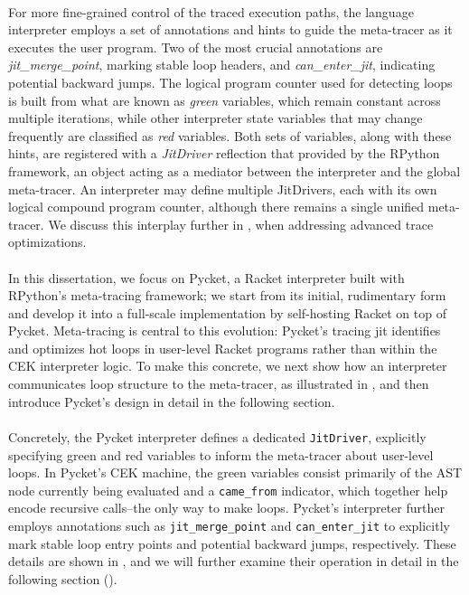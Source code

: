         \paragraph{}%
            For more fine-grained control of the traced execution paths, the language interpreter employs a set of annotations and hints to guide the meta-tracer as it executes the user program. Two of the most crucial annotations are \emph{jit\_merge\_point}, marking stable loop headers, and \emph{can\_enter\_jit}, indicating potential backward jumps. The logical program counter used for detecting loops is built from what are known as \emph{green} variables, which remain constant across multiple iterations, while other interpreter state variables that may change frequently are classified as \emph{red} variables. Both sets of variables, along with these hints, are registered with a \emph{JitDriver} reflection that provided by the RPython framework, an object acting as a mediator between the interpreter and the global meta-tracer. An interpreter may define multiple JitDrivers, each with its own logical compound program counter, although there remains a single unified meta-tracer. We discuss this interplay further in , when addressing advanced trace optimizations.

        \paragraph{}%
            In this dissertation, we focus on Pycket, a Racket interpreter built with RPython's meta-tracing framework; we start from its initial, rudimentary form and develop it into a full-scale implementation by self-hosting Racket on top of Pycket. Meta-tracing is central to this evolution: Pycket's tracing \gls{jit} identifies and optimizes hot loops in user-level Racket programs rather than within the CEK interpreter logic. To make this concrete, we next show how an interpreter communicates loop structure to the meta-tracer, as illustrated in , and then introduce Pycket's design in detail in the following section.


        \paragraph{}%
            Concretely, the Pycket interpreter defines a dedicated \texttt{JitDriver}, explicitly specifying green and red variables to inform the meta-tracer about user-level loops. In Pycket’s CEK machine, the green variables consist primarily of the AST node currently being evaluated and a \texttt{came\_from} indicator, which together help encode recursive calls--the only way to make loops. Pycket’s interpreter further employs annotations such as \texttt{jit\_merge\_point} and \texttt{can\_enter\_jit} to explicitly mark stable loop entry points and potential backward jumps, respectively. These details are shown in , and we will further examine their operation in detail in the following section ().

